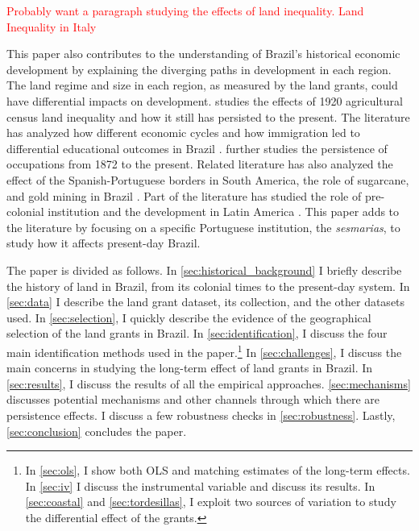 \documentclass[11pt]{article}
\newcommand{\red}[1]{\textcolor{red}{#1}}
\begin{document}
\red{Probably want a paragraph studying the effects of land inequality.}
\red{Land Inequality in Italy \parencite{Bianchi-Vimercati2022-jy}}

This paper also contributes to the understanding of Brazil's historical economic development by explaining the diverging paths in development in each region. 
The land regime and size in each region, as measured by the land grants, could have differential impacts on development.
\textcite{Wigton-Jones2020-ex} studies the effects of 1920 agricultural census land inequality and how it still has persisted to the present.
The literature has analyzed how different economic cycles and how immigration led to differential educational outcomes in Brazil \parencite{Musacchio2014-pq,Rocha2017-yq, de-Carvalho-Filho2012-pc}.
\textcite{Ehrl2019-zp} further studies the persistence of occupations from 1872 to the present.
Related literature has also analyzed the effect of the Spanish-Portuguese borders in South America, the role of sugarcane, and gold mining in Brazil \parencites{Laudares2023-wl, Naritomi2012-or}.
Part of the literature has studied the role of pre-colonial institution and the development in Latin America \parencite{Caum-Julio2023-ei, Maloney2016-qv}.
This paper adds to the literature by focusing on a specific Portuguese institution, the \textit{sesmarias}, to study how it affects present-day Brazil.


The paper is divided as follows. In \autoref{sec:historical_background} I briefly describe the history of land in Brazil, from its colonial times to the present-day system. 
In \autoref{sec:data} I describe the land grant dataset, its collection, and the other datasets used. 
In \autoref{sec:selection}, I quickly describe the evidence of the geographical selection of the land grants in Brazil.
In \autoref{sec:identification}, I discuss the four main identification methods used in the paper.\footnote{In \autoref{sec:ols}, I show both OLS and matching estimates of the long-term effects.
In \autoref{sec:iv} I discuss the instrumental variable and discuss its results.
In \autoref{sec:coastal} and \autoref{sec:tordesillas}, I exploit two sources of variation to study the differential effect of the grants.}
In \autoref{sec:challenges}, I discuss the main concerns in studying the long-term effect of land grants in Brazil. 
In \autoref{sec:results}, I discuss the results of all the empirical approaches.
\autoref{sec:mechanisms} discusses potential mechanisms and other channels through which there are persistence effects.
I discuss a few robustness checks in \autoref{sec:robustness}.
Lastly, \autoref{sec:conclusion} concludes the paper.
\end{document}
